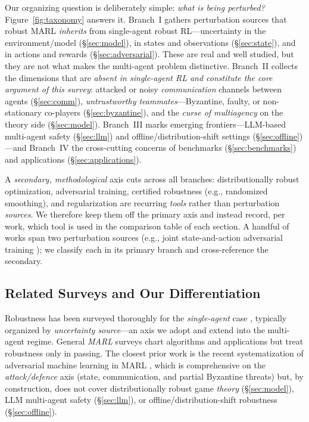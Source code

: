 Our organizing question is deliberately simple: \emph{what is being perturbed?}
Figure~\ref{fig:taxonomy} answers it. Branch~I gathers perturbation sources that
robust MARL \emph{inherits} from single-agent robust RL---uncertainty in the
environment/model (\S\ref{sec:model}), in states and observations
(\S\ref{sec:state}), and in actions and rewards (\S\ref{sec:adversarial}). These
are real and well studied, but they are not what makes the multi-agent problem
distinctive. Branch~II collects the dimensions that are \emph{absent in
single-agent RL and constitute the core argument of this survey}: attacked or
noisy \emph{communication} channels between agents (\S\ref{sec:comm}),
\emph{untrustworthy teammates}---Byzantine, faulty, or non-stationary co-players
(\S\ref{sec:byzantine}), and the \emph{curse of multiagency} on the theory side
(\S\ref{sec:model}). Branch~III marks emerging frontiers---LLM-based multi-agent
safety (\S\ref{sec:llm}) and offline/distribution-shift settings
(\S\ref{sec:offline})---and Branch~IV the cross-cutting concerns of benchmarks
(\S\ref{sec:benchmarks}) and applications (\S\ref{sec:applications}).

A \emph{secondary, methodological} axis cuts across all branches: distributionally
robust optimization, adversarial training, certified robustness (e.g., randomized
smoothing), and regularization are recurring \emph{tools} rather than perturbation
\emph{sources}. We therefore keep them off the primary axis and instead record,
per work, which tool is used in the comparison table of each section. A handful of
works span two perturbation sources (e.g., joint state-and-action adversarial
training \cite{bukharin2023robust}); we classify each in its primary branch and
cross-reference the secondary.

\subsection{Related Surveys and Our Differentiation}
\label{sec:bg-related}

Robustness has been surveyed thoroughly for the \emph{single-agent} case
\cite{moos2022robust,gu2026robust,mohan2026towards}, typically organized by
\emph{uncertainty source}---an axis we adopt and extend into the multi-agent
regime. General \emph{MARL} surveys \cite{zhang2021multi,gronauer2022multi,
jin2025comprehensive} chart algorithms and applications but treat robustness only
in passing. The closest prior work is the recent systematization of adversarial
machine learning in MARL \cite{adversarialml2025}, which is comprehensive on the
\emph{attack/defence} axis (state, communication, and partial Byzantine threats)
but, by construction, does not cover distributionally robust game \emph{theory}
(\S\ref{sec:model}), LLM multi-agent safety (\S\ref{sec:llm}), or
offline/distribution-shift robustness (\S\ref{sec:offline}).


